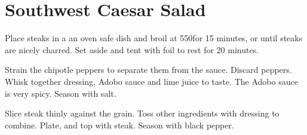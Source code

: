 \section{Southwest Caesar Salad}
\begin{recipe}



Place steaks in a an oven safe dish and broil at 550\degree for 15 minutes, or until steaks are nicely charred. Set aside and tent with foil to rest for 20 minutes.


Strain the chipotle peppers to separate them from the sauce. Discard peppers. Whisk together dressing, Adobo sauce and lime juice to taste. The Adobo sauce is very spicy. Season with salt.


Slice steak thinly against the grain. Toss other ingredients with dressing to combine. Plate, and top with steak. Season with black pepper.


\end{recipe}

